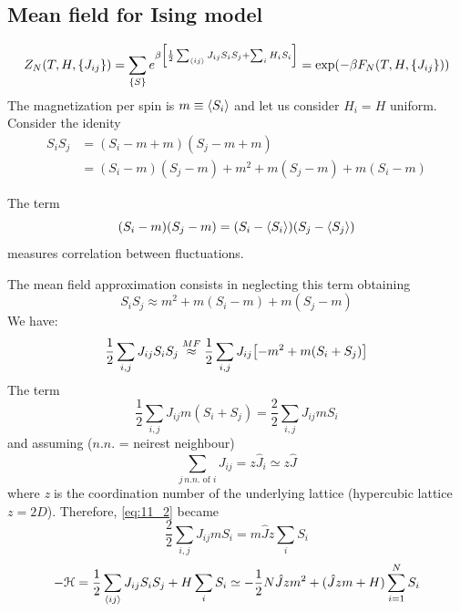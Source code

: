 \documentclass[../main/main.tex]{subfiles}
\begin{document}
\subsection{Mean field for Ising model}
\begin{equation}
  Z_N (T,H,\{ J_{ij} \}  )= \sum_{\{ S \}  }^{} e^{\beta \qty[\frac{1}{2} \sum_{\expval{ij} }^{} J_{ij} S_i S_j + \sum_{i}^{} H_i S_i   ] } = \exp (-\beta F_N (T,H,\{ J_{ij} \}  ))
\end{equation}
The magnetization per spin is \( m \equiv \expval{S_i}  \) and let us consider \( H_i = H \) uniform. Consider the idenity
\begin{equation}
\begin{split}
  S_i S_j  &= (S_i - m + m) (S_j - m + m)  \\
  & = (S_i - m ) (S_j - m)  + m^2 + m (S_j-m) + m (S_i-m)
\end{split}
\end{equation}
\begin{remark}
The term
\begin{equation}
  (S_i - m ) (S_j - m) = (S_i - \expval{S_i})(S_j - \expval{S_j})
\end{equation}
measures correlation between fluctuations.
\end{remark}
The mean field approximation consists in neglecting this term obtaining
\begin{equation}
  S_i S_j  \approx m^2 + m(S_i-m) + m(S_j-m)
\end{equation}
We have:
\begin{equation}
  \frac{1}{2} \sum_{i,j}^{} J_{ij}S_i S_j \overset{MF}{\approx } \frac{1}{2} \sum_{i,j }^{} J_{ij} \qty[-m^2+m(S_i+S_j)]
\end{equation}
The term
\begin{equation}
  \frac{1}{2} \sum_{i,j }^{} J_{ij} m(S_i+S_j) = \frac{2}{2} \sum_{i,j }^{} J_{ij} m S_i
  \label{eq:11_2}
\end{equation}
and assuming (\( n.n. \) = neirest neighbour)
\begin{equation}
  \sum_{j \, n.n.\text{ of } i}^{} J_{ij} = z \hat{J}_i \simeq  z \hat{J}
\end{equation}
where \emph{z} is the coordination number of the underlying lattice (hypercubic lattice \( z=2D \)). Therefore, \eqref{eq:11_2} became
\begin{equation}
  \frac{2}{2} \sum_{i,j }^{} J_{ij} m S_i = m \hat{J} z \sum_{i}^{} S_i
\end{equation}
\begin{equation}
  -\mathcal{H} = \frac{1}{2} \sum_{\expval{ij} }^{} J_{ij} S_i S_j + H \sum_{i}^{} S_i \simeq - \frac{1}{2} N \hat{J} z m^2 + (\hat{J} z m + H) \sum_{i=1}^{N} S_i
\end{equation}
\end{document}
